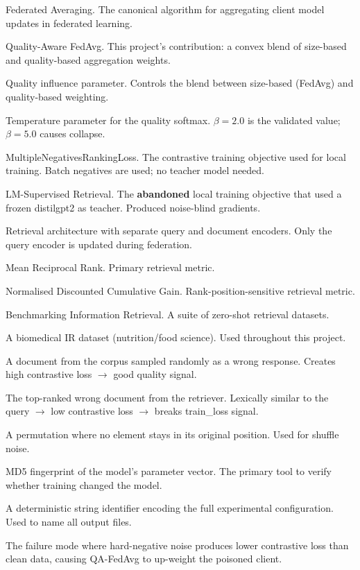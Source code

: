 \documentclass[12pt,a4paper]{article}
\begin{document}
\begin{description}[leftmargin=3.5cm, style=nextline]
  \item[FedAvg] Federated Averaging. The canonical algorithm for aggregating client model updates in federated learning.
  \item[QA-FedAvg] Quality-Aware FedAvg. This project's contribution: a convex blend of size-based and quality-based aggregation weights.
  \item[$\alpha$] Quality influence parameter. Controls the blend between size-based (FedAvg) and quality-based weighting.
  \item[$\beta$] Temperature parameter for the quality softmax. $\beta=2.0$ is the validated value; $\beta=5.0$ causes collapse.
  \item[MNR / InfoNCE] MultipleNegativesRankingLoss. The contrastive training objective used for local training. Batch negatives are used; no teacher model needed.
  \item[LSR] LM-Supervised Retrieval. The \textbf{abandoned} local training objective that used a frozen distilgpt2 as teacher. Produced noise-blind gradients.
  \item[Bi-encoder] Retrieval architecture with separate query and document encoders. Only the query encoder is updated during federation.
  \item[MRR] Mean Reciprocal Rank. Primary retrieval metric.
  \item[NDCG] Normalised Discounted Cumulative Gain. Rank-position-sensitive retrieval metric.
  \item[BEIR] Benchmarking Information Retrieval. A suite of zero-shot retrieval datasets.
  \item[NFCorpus] A biomedical IR dataset (nutrition/food science). Used throughout this project.
  \item[Random negative] A document from the corpus sampled randomly as a wrong response. Creates high contrastive loss $\rightarrow$ good quality signal.
  \item[Hard negative] The top-ranked wrong document from the retriever. Lexically similar to the query $\rightarrow$ low contrastive loss $\rightarrow$ breaks train\_loss signal.
  \item[Derangement] A permutation where no element stays in its original position. Used for shuffle noise.
  \item[Model hash] MD5 fingerprint of the model's parameter vector. The primary tool to verify whether training changed the model.
  \item[Run slug] A deterministic string identifier encoding the full experimental configuration. Used to name all output files.
  \item[False clean illusion] The failure mode where hard-negative noise produces lower contrastive loss than clean data, causing QA-FedAvg to up-weight the poisoned client.
\end{description}
\end{document}

